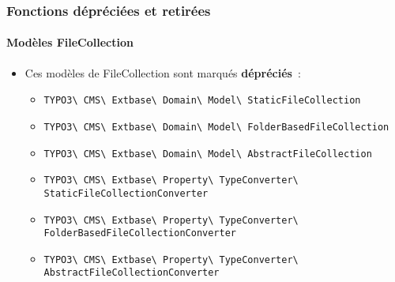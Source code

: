 \begin{frame}[fragile]
	\frametitle{Fonctions dépréciées et retirées}
	\framesubtitle{Modèles FileCollection}

	\begin{itemize}
		\item Ces modèles de FileCollection sont marqués \textbf{dépréciés}~:
			\vspace{0.4cm}
			\begin{itemize}\tiny
				\item \texttt{TYPO3\textbackslash
					CMS\textbackslash
					Extbase\textbackslash
					Domain\textbackslash
					Model\textbackslash
					StaticFileCollection}

				\item \texttt{TYPO3\textbackslash
					CMS\textbackslash
					Extbase\textbackslash
					Domain\textbackslash
					Model\textbackslash
					FolderBasedFileCollection}

				\item \texttt{TYPO3\textbackslash
					CMS\textbackslash
					Extbase\textbackslash
					Domain\textbackslash
					Model\textbackslash
					AbstractFileCollection}

				\item \texttt{TYPO3\textbackslash
					CMS\textbackslash
					Extbase\textbackslash
					Property\textbackslash
					TypeConverter\textbackslash
					StaticFileCollectionConverter}

				\item \texttt{TYPO3\textbackslash
					CMS\textbackslash
					Extbase\textbackslash
					Property\textbackslash
					TypeConverter\textbackslash
					FolderBasedFileCollectionConverter}

				\item \texttt{TYPO3\textbackslash
					CMS\textbackslash
					Extbase\textbackslash
					Property\textbackslash
					TypeConverter\textbackslash
					AbstractFileCollectionConverter}

			\end{itemize}

	\end{itemize}

\end{frame}


